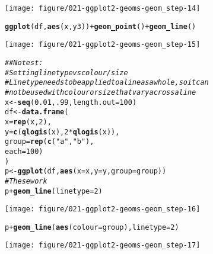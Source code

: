 \documentclass[a4paper,titlepage]{tufte-handout}\usepackage[]{graphicx}\usepackage[]{color}
\makeatletter
\def\maxwidth{ %
  \ifdim\Gin@nat@width>\linewidth
    \linewidth
  \else
    \Gin@nat@width
  \fi
}
\newcommand{\hlnum}[1]{\textcolor[rgb]{0.686,0.059,0.569}{#1}}%
\newcommand{\hlstr}[1]{\textcolor[rgb]{0.192,0.494,0.8}{#1}}%
\newcommand{\hlcom}[1]{\textcolor[rgb]{0.678,0.584,0.686}{\textit{#1}}}%
\newcommand{\hlopt}[1]{\textcolor[rgb]{0,0,0}{#1}}%
\newcommand{\hlstd}[1]{\textcolor[rgb]{0.345,0.345,0.345}{#1}}%
\newcommand{\hlkwb}[1]{\textcolor[rgb]{0.69,0.353,0.396}{#1}}%
\newcommand{\hlkwc}[1]{\textcolor[rgb]{0.333,0.667,0.333}{#1}}%
\newcommand{\hlkwd}[1]{\textcolor[rgb]{0.737,0.353,0.396}{\textbf{#1}}}%
\newenvironment{kframe}{%
 \def\at@end@of@kframe{}%
 \ifinner\ifhmode%
  \def\at@end@of@kframe{\end{minipage}}%
  \begin{minipage}{\columnwidth}%
 \fi\fi%
 \def\FrameCommand##1{\hskip\@totalleftmargin \hskip-\fboxsep
 \colorbox{shadecolor}{##1}\hskip-\fboxsep
     \hskip-\linewidth \hskip-\@totalleftmargin \hskip\columnwidth}%
 \MakeFramed {\advance\hsize-\width
   \@totalleftmargin\z@ \linewidth\hsize
   \@setminipage}}%
 {\par\unskip\endMakeFramed%
 \at@end@of@kframe}
\newenvironment{knitrout}{}{} %
\makeatother
\begin{document}
\begin{knitrout}
\begin{kframe}
{\ttfamily\noindent\color{warningcolor}{\#\# Warning: Removed 1 rows containing missing values (geom\_point).}}

{\ttfamily\noindent\color{warningcolor}{\#\# Warning: Removed 1 rows containing missing values (geom\_path).}}\end{kframe}
\texttt{[image: figure/021-ggplot2-geoms-geom\_step-14]} 
\begin{kframe}\begin{alltt}
\hlkwd{ggplot}\hlstd{(df,} \hlkwd{aes}\hlstd{(x, y3))} \hlopt{+} \hlkwd{geom_point}\hlstd{()} \hlopt{+} \hlkwd{geom_line}\hlstd{()}
\end{alltt}


{\ttfamily\noindent\color{warningcolor}{\#\# Warning: Removed 1 rows containing missing values (geom\_point).}}\end{kframe}
\texttt{[image: figure/021-ggplot2-geoms-geom\_step-15]} 
\begin{kframe}\begin{alltt}
\hlcom{## No test: }
\hlcom{# Setting line type vs colour/size}
\hlcom{# Line type needs to be applied to a line as a whole, so it can}
\hlcom{# not be used with colour or size that vary across a line}
\hlstd{x} \hlkwb{<-} \hlkwd{seq}\hlstd{(}\hlnum{0.01}\hlstd{,} \hlnum{.99}\hlstd{,} \hlkwc{length.out} \hlstd{=} \hlnum{100}\hlstd{)}
\hlstd{df} \hlkwb{<-} \hlkwd{data.frame}\hlstd{(}
  \hlkwc{x} \hlstd{=} \hlkwd{rep}\hlstd{(x,} \hlnum{2}\hlstd{),}
  \hlkwc{y} \hlstd{=} \hlkwd{c}\hlstd{(}\hlkwd{qlogis}\hlstd{(x),} \hlnum{2} \hlopt{*} \hlkwd{qlogis}\hlstd{(x)),}
  \hlkwc{group} \hlstd{=} \hlkwd{rep}\hlstd{(}\hlkwd{c}\hlstd{(}\hlstr{"a"}\hlstd{,}\hlstr{"b"}\hlstd{),}
  \hlkwc{each} \hlstd{=} \hlnum{100}\hlstd{)}
\hlstd{)}
\hlstd{p} \hlkwb{<-} \hlkwd{ggplot}\hlstd{(df,} \hlkwd{aes}\hlstd{(}\hlkwc{x}\hlstd{=x,} \hlkwc{y}\hlstd{=y,} \hlkwc{group}\hlstd{=group))}
\hlcom{# These work}
\hlstd{p} \hlopt{+} \hlkwd{geom_line}\hlstd{(}\hlkwc{linetype} \hlstd{=} \hlnum{2}\hlstd{)}
\end{alltt}
\end{kframe}
\texttt{[image: figure/021-ggplot2-geoms-geom\_step-16]} 
\begin{kframe}\begin{alltt}
\hlstd{p} \hlopt{+} \hlkwd{geom_line}\hlstd{(}\hlkwd{aes}\hlstd{(}\hlkwc{colour} \hlstd{= group),} \hlkwc{linetype} \hlstd{=} \hlnum{2}\hlstd{)}
\end{alltt}
\end{kframe}
\texttt{[image: figure/021-ggplot2-geoms-geom\_step-17]} 

\end{knitrout}
\end{document}
